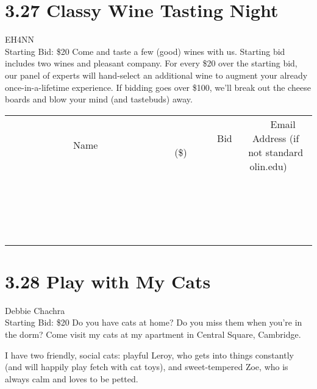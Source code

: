 \documentclass[11pt]{article}
\begin{document}
\section*{3.27 Classy Wine Tasting Night}
EH4NN
\\
Starting Bid: \$20
\newline
Come and taste a few (good) wines with us. Starting bid includes two wines and pleasant company. For every \$20 over the starting bid, our panel of experts will hand-select an additional wine to augment your already once-in-a-lifetime experience. If bidding goes over \$100, we'll break out the cheese boards and blow your mind (and tastebuds) away.
\\[3ex]
\begin{tabular}{c c c}
~~~~~~~~~~~~~Name~~~~~~~~~~~~~ & ~~~~~~~~~Bid (\$)~~~~~~~~~  & ~~~Email Address (if not standard olin.edu)~~~\\
 & & \\
\hline
 & & \\
\hline
 & & \\
\hline
 & & \\
\hline
 & & \\
\hline
 & & \\
\hline
 & & \\
\hline
 & & \\
\hline
 & & \\
\hline
 & & \\
\hline
 & & \\
\hline
 & & \\
\hline
 & & \\
\hline
 & & \\
\hline
 & & \\
\hline
 & & \\
\hline
 & & \\
\hline
 & & \\
\hline
 & & \\
\hline
\end{tabular}
\newpage
\section*{3.28 Play with My Cats}
Debbie Chachra
\\
Starting Bid: \$20
\newline
Do you have cats at home? Do you miss them when you're in the dorm? Come visit my cats at my apartment in Central Square, Cambridge.

I have two friendly, social cats: playful Leroy, who gets into things constantly (and will happily play fetch with cat toys), and sweet-tempered Zoe, who is always calm and loves to be petted. 
\end{document}
